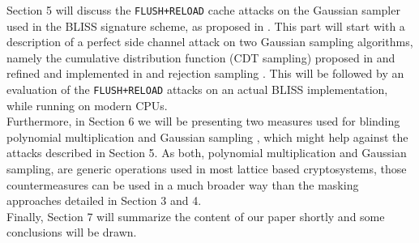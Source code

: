 Section 5 will discuss the \verb|FLUSH+RELOAD| cache attacks on the Gaussian sampler used in the BLISS signature scheme, as proposed in \cite{cryptoeprint:2016:300}. 
This part will start with a description of a perfect side channel attack on two Gaussian sampling algorithms, namely the cumulative distribution function (CDT sampling) proposed in \cite{cryptoeprint:2010:088} and refined and implemented in \cite{cryptoeprint:2014:254} and rejection sampling \cite{cryptoeprint:2013:383}. This will be followed by an evaluation of the \verb|FLUSH+RELOAD| attacks on an actual BLISS implementation, while running on modern CPUs.\\
Furthermore, in Section 6 we will be presenting two measures used for blinding polynomial multiplication and Gaussian sampling \cite{cryptoeprint:2016:276}, which might help against the attacks described in Section 5. As both, polynomial multiplication and Gaussian sampling, are generic operations used in most lattice based cryptosystems, those countermeasures can be used in a much broader way than the masking approaches detailed in Section 3 and 4.\\
Finally, Section 7 will summarize the content of our paper shortly and some conclusions will be drawn.